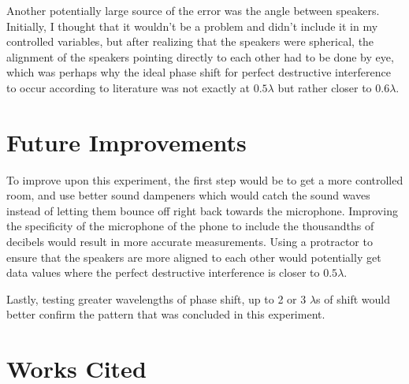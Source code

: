 \documentclass[index]{subfiles}
\begin{document}
Another potentially large source of the error was the angle between speakers. Initially, I thought that it wouldn't be a problem and didn't include it in my controlled variables, but after realizing that the speakers were spherical, the alignment of the speakers pointing directly to each other had to be done by eye, which was perhaps why the ideal phase shift for perfect destructive interference to occur according to literature was not exactly at \(0.5\lambda\) but rather closer to \(0.6\lambda\).


\section{Future Improvements}

To improve upon this experiment, the first step would be to get a more controlled room, and use better sound dampeners which would catch the sound waves instead of letting them bounce off right back towards the microphone. Improving the specificity of the microphone of the phone to include the thousandths of decibels would result in more accurate measurements. Using a protractor to ensure that the speakers are more aligned to each other would potentially get data values where the perfect destructive interference is closer to \(0.5\lambda\).

Lastly, testing greater wavelengths of phase shift, up to 2 or 3 \(\lambda\)s of shift would better confirm the pattern that was concluded in this experiment.

\section{Works Cited}


\end{document}
